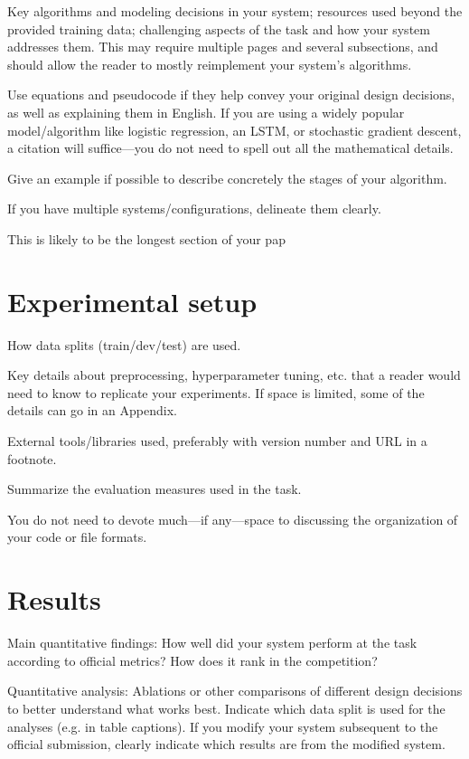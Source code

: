 \documentclass[11pt]{article}
\begin{document}
Key algorithms and modeling decisions in your system; resources used beyond the provided training data; challenging aspects of the task and how your system addresses them. This may require multiple pages and several subsections, and should allow the reader to mostly reimplement your system’s algorithms.

Use equations and pseudocode if they help convey your original design decisions, as well as explaining them in English. If you are using a widely popular model/algorithm like logistic regression, an LSTM, or stochastic gradient descent, a citation will suffice—you do not need to spell out all the mathematical details.

Give an example if possible to describe concretely the stages of your algorithm.

If you have multiple systems/configurations, delineate them clearly.

This is likely to be the longest section of your pap

\section{Experimental setup}



How data splits (train/dev/test) are used.

Key details about preprocessing, hyperparameter tuning, etc. that a reader would need to know to replicate your experiments. If space is limited, some of the details can go in an Appendix.

External tools/libraries used, preferably with version number and URL in a footnote.

Summarize the evaluation measures used in the task.

You do not need to devote much—if any—space to discussing the organization of your code or file formats.

\section{Results}



Main quantitative findings: How well did your system perform at the task according to official metrics? How does it rank in the competition?

Quantitative analysis: Ablations or other comparisons of different design decisions to better understand what works best. Indicate which data split is used for the analyses (e.g. in table captions). If you modify your system subsequent to the official submission, clearly indicate which results are from the modified system.
\end{document}
